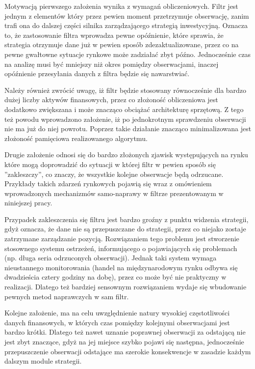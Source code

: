 \documentclass[a4paper,12pt,openany, DIV=calc, headsepline]{scrbook}
\begin{document}
Motywacją pierwszego założenia wynika z wymagań obliczeniowych. Filtr jest jednym z elementów który przez pewien moment przetrzymuje obserwację, zanim trafi ona do dalszej części silnika zarządzającego strategią inwestycyjną. Oznacza to, że zastosowanie filtra wprowadza pewne opóźnienie, które sprawia, że strategia otrzymuje dane już w pewien sposób zdezaktualizowane, przez co na pewne gwałtowne sytuacje rynkowe może zadziałać zbyt późno. Jednocześnie czas na analizę musi być mniejszy niż okres pomiędzy obserwacjami, inaczej opóźnienie przesyłania danych z filtra będzie się nawarstwiać.

Należy również zwrócić uwagę, iż filtr będzie  stosowany równocześnie dla bardzo dużej liczby aktywów finansowych, przez co złożoność obliczeniowa jest dodatkowo zwiększana i może znacząco obciążać architekturę sprzętową. Z tego też powodu wprowadzono założenie, iż po jednokrotnym sprawdzeniu obserwacji nie ma już do niej powrotu. Poprzez takie działanie znacząco minimalizowana jest złożoność pamięciowa realizowanego algorytmu.

Drugie założenie odnosi się do bardzo złożonych zjawisk występujących na rynku które mogą doprowadzić do sytuacji w której filtr w pewien sposób się ''zakleszczy'', co znaczy, że wszystkie kolejne obserwacje będą odrzucane. Przykłady takich zdarzeń rynkowych  pojawią się wraz z omówieniem wprowadzonych mechanizmów samo-naprawy w filtrze prezentowanym w niniejszej pracy.

Przypadek zakleszczenia się filtru jest bardzo groźny z punktu widzenia strategii, gdyż oznacza, że dane nie są przepuszczane do strategii, przez co niejako zostaje zatrzymane zarządzanie pozycją. Rozwiązaniem tego problemu jest stworzenie stosownego systemu ostrzeżeń, informującego o pojawiających się problemach (np. długa seria odrzuconych obserwacji). Jednak taki system wymaga nieustannego monitorowania (handel na międzynarodowym rynku odbywa się dwadzieścia cztery godziny na dobę), przez co może być nie praktyczny w realizacji. Dlatego też bardziej sensownym rozwiązaniem wydaje się wbudowanie pewnych metod naprawczych w sam filtr.

Kolejne założenie, ma na celu uwzględnienie natury wysokiej częstotliwości danych finansowych, w których czas pomiędzy kolejnymi obserwacjami jest bardzo krótki. Dlatego też nawet  uznanie poprawnej obserwacji za odstającą nie jest zbyt znaczące, gdyż na jej miejsce szybko pojawi się następna, jednocześnie przepuszczenie obserwacji odstające ma szerokie konsekwencje w zasadzie każdym dalszym module strategii.
\end{document}
